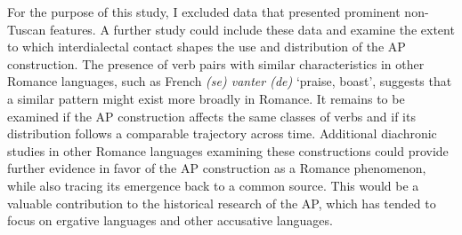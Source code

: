\documentclass[output=paper,colorlinks,citecolor=brown]{langscibook}
\begin{document}
For the purpose of this study, I excluded data that presented prominent non-Tuscan features. A further study could include these data and examine the extent to which interdialectal contact shapes the use and distribution of the AP construction.
The presence of verb pairs with similar characteristics in other Romance languages, such as French \textit{(se) vanter (de)} `praise, boast’, suggests that a similar pattern might exist more broadly in Romance. It remains to be examined if the AP construction affects the same classes of verbs and if its distribution follows a comparable trajectory across time. Additional diachronic studies in other Romance languages examining these constructions could provide further evidence in favor of the AP construction as a Romance phenomenon, while also tracing its emergence back to a common source. This would be a valuable contribution to the historical research of the AP, which has tended to focus on ergative languages and other accusative languages.
\end{document}
